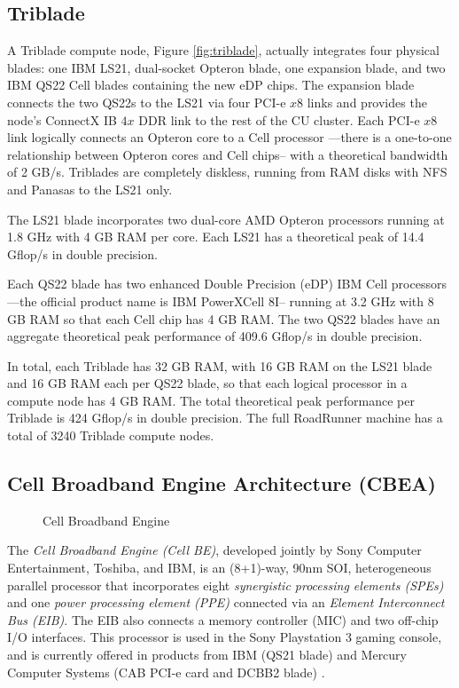 \documentclass[letter,10pt]{article}
\begin{document}
\subsection*{Triblade}

A Triblade compute node, Figure \ref{fig:triblade}, actually integrates four physical blades: one IBM LS21, dual-socket Opteron blade, one expansion blade, and two IBM QS22 Cell blades containing the new eDP chips.  The expansion blade connects the two QS22s to the LS21 via four PCI-e $x8$ links and provides the node's ConnectX IB $4x$ DDR link to the rest of the CU cluster.  Each PCI-e $x8$ link logically connects an Opteron core to a Cell processor ---there is a one-to-one relationship between Opteron cores and Cell chips-- with a theoretical bandwidth of 2 GB/s.  Triblades are completely diskless, running from RAM disks with NFS and Panasas \cite{panasas} to the LS21 only.

The LS21 blade incorporates two dual-core AMD Opteron processors running at 1.8 GHz with 4 GB RAM per core.  Each LS21 has a theoretical peak of 14.4 Gflop/s in double precision.

Each QS22 blade has two enhanced Double Precision (eDP) IBM Cell processors ---the official product name is IBM PowerXCell 8I-- running at 3.2 GHz with 8 GB RAM so that each Cell chip has 4 GB RAM.  The two QS22 blades have an aggregate theoretical peak performance of 409.6 Gflop/s in double precision.

In total, each Triblade has 32 GB RAM, with 16 GB RAM on the LS21 blade and 16 GB RAM each per QS22 blade, so that each logical processor in a compute node has 4 GB RAM.  The total theoretical peak performance per Triblade is 424 Gflop/s in double precision.  The full RoadRunner machine has a total of 3240 Triblade compute nodes.

\subsection*{Cell Broadband Engine Architecture (CBEA)}

\begin{figure}
    \begin{center}
    \caption{Cell Broadband Engine}
    \label{image:cell}
    \end{center}
\end{figure}

The \emph{Cell Broadband Engine (Cell BE)}, developed jointly by Sony Computer Entertainment, Toshiba, and IBM, is an (8+1)-way, 90nm SOI, heterogeneous parallel processor that incorporates eight \emph{synergistic processing elements (SPEs)} and one \emph{power processing element (PPE)} connected via an \emph{Element Interconnect Bus (EIB)}.  The EIB also connects a memory controller (MIC) and two off-chip I/O interfaces.  This processor is used in the Sony Playstation 3 gaming console, and is currently offered in products from IBM (QS21 blade) and Mercury Computer Systems (CAB PCI-e card and DCBB2 blade) \cite{mercury}.
\end{document}
